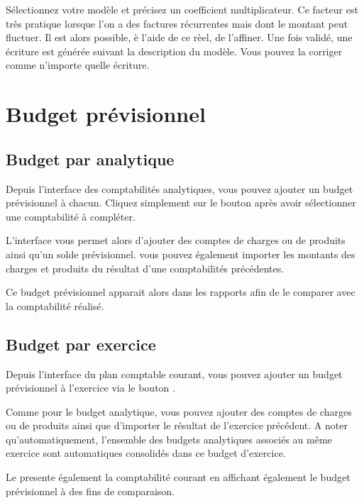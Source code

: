 \documentclass[a4paper,10pt,oneside,french]{sphinxmanual}
\begin{document}
Sélectionnez votre modèle et précisez un coefficient multiplicateur. Ce facteur est très pratique lorsque l’on a des factures récurrentes mais dont le montant peut fluctuer. Il est alors possible, è l’aide de ce rèel, de l’affiner.
Une fois validé, une écriture est générée suivant la description du modèle. Vous pouvez la corriger comme n’importe quelle écriture.


\section{Budget prévisionnel}
\label{\detokenize{accounting/budget:budget-previsionnel}}\label{\detokenize{accounting/budget::doc}}

\subsection{Budget par analytique}
\label{\detokenize{accounting/budget:budget-par-analytique}}
Depuis l’interface des comptabilités analytiques, vous pouvez ajouter un budget prévisionnel à chacun.
Cliquez simplement sur le bouton  après avoir sélectionner une comptabilité à compléter.

L’interface vous permet alors d’ajouter des comptes de charges ou de produits ainsi qu’un solde prévisionnel.
vous pouvez également importer les montants des charges et produits du résultat d’une comptabilités précédentes.

Ce budget prévisionnel apparait alors dans les rapports afin de le comparer avec la comptabilité réalisé.


\subsection{Budget par exercice}
\label{\detokenize{accounting/budget:budget-par-exercice}}
Depuis l’interface du plan comptable courant, vous pouvez ajouter un budget prévisionnel à l’exercice via le bouton .

Comme pour le budget analytique, vous pouvez ajouter des comptes de charges ou de produits ainsi que d’importer le résultat de l’exercice précédent.
A noter qu’automatiquement, l’ensemble des budgets analytiques associés au même exercice sont automatiques consolidés dans ce budget d’exercice.

Le  presente également la comptabilité courant en affichant également le budget prévisionnel à des fins de comparaison.
\end{document}
